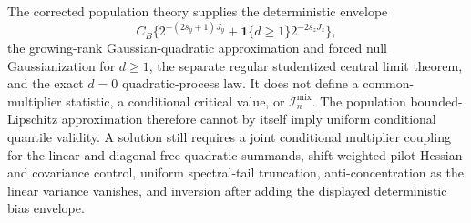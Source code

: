 The corrected population theory supplies the deterministic envelope
\[
C_B\{2^{-(2s_y+1)J_y}+\mathbf 1\{d\ge1\}2^{-2s_zJ_z}\},
\]
the growing-rank Gaussian-quadratic approximation and forced null Gaussianization for \(d\ge1\), the separate regular studentized central limit theorem, and the exact \(d=0\) quadratic-process law.  It does not define a common-multiplier statistic, a conditional critical value, or \(\mathcal I_n^{\mathrm{mix}}\).  The population bounded-Lipschitz approximation therefore cannot by itself imply uniform conditional quantile validity.  A solution still requires a joint conditional multiplier coupling for the linear and diagonal-free quadratic summands, shift-weighted pilot-Hessian and covariance control, uniform spectral-tail truncation, anti-concentration as the linear variance vanishes, and inversion after adding the displayed deterministic bias envelope.